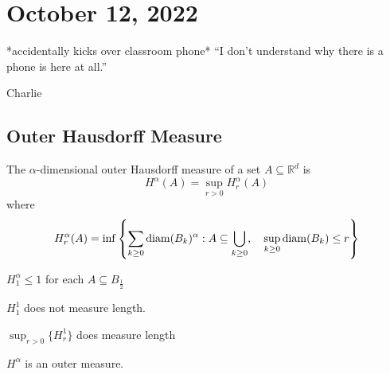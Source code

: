 \section{October 12, 2022}

\epigraph{*accidentally kicks over classroom phone* ``I don't understand why there is a phone is here at all.''}{Charlie}

\subsection{Outer Hausdorff Measure}
The $\alpha$-dimensional outer Hausdorff measure of a set $A \subseteq \mathbb{R}^d$ is
\[
	H^{\alpha} (A) = \sup_{r > 0} H_{r}^{\alpha} (A)
\]
where
\[
	H_{r}^{\alpha} (A) = \inf\left\{ \sum_{k \geq 0} \operatorname*{diam} (B_k)^{\alpha} : A \subseteq \bigcup_{k \geq 0}, \quad \sup_{k \geq 0} \operatorname*{diam} (B_{k} ) \leq r \right\}
\]

\begin{example}
	$H_{1}^{\alpha} \leq 1$ for each $A \subseteq B_{\frac{1}{2}}$

	$H_{1}^{1}$ does not measure length.

	$\sup_{r > 0} \{H_{r}^{1}\}$ does measure length
\end{example}

\begin{lemma}
	$H^{\alpha}$ is an outer measure.
\end{lemma}

